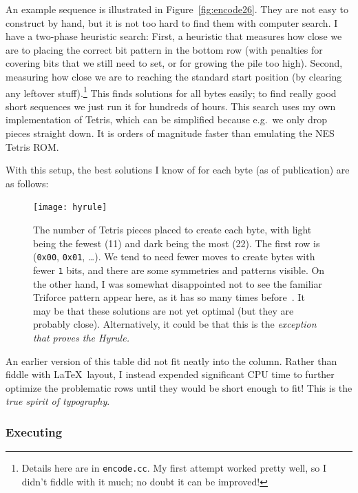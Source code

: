 \documentclass[twocolumn]{article}
\begin{document}
An example sequence is illustrated in Figure~\ref{fig:encode26}. They
are not easy to construct by hand, but it is not too hard to find them
with computer search. I have a two-phase heuristic search: First,
a heuristic that measures how close we are to placing the correct bit
pattern in the bottom row (with penalties for covering bits that we
still need to set, or for growing the pile too high). Second, measuring
how close we are to reaching the standard start position (by clearing
any leftover stuff).\!\footnote{Details here are in {\tt encode.cc}.
  My first attempt worked pretty well, so I didn't fiddle with it
  much; no doubt it can be improved!} This finds solutions for all
bytes easily; to find really good short sequences we just run it for
hundreds of hours. This search uses my own implementation of Tetris,
which can be simplified because e.g.~we only drop pieces straight down.
It is orders of magnitude faster than emulating the NES Tetris ROM.

With this setup, the best solutions I know of for each byte (as of
publication) are as follows:

\begin{figure}[ht]
  \centering
  \texttt{[image: hyrule]}
  \caption{
    The number of Tetris pieces placed to create each byte, with
    light being the fewest (11) and dark being the most (22). The
    first row is ({\tt 0x00}, {\tt 0x01}, \ldots). We tend to need
    fewer moves to create bytes with fewer {\tt 1} bits, and there
    are some symmetries and patterns visible. On the other hand,
    I was somewhat disappointed not to see the familiar Triforce
    pattern appear here, as it has so many times before~\cite{murphy2014new,murphy2017zm,murphy2018making}. It may be that these solutions are not yet
    optimal (but they are probably close). Alternatively, 
    it could be that this is the {\em exception that proves
    the Hyrule.}
  } \label{fig:hyrule}
\end{figure}



An earlier version of this table did not fit neatly into the column.
Rather than fiddle with \LaTeX\ layout, I instead expended significant
CPU time to further optimize the problematic rows until they would
be short enough to fit! This is the {\em true spirit of typography}.

\subsubsection{Executing}
\end{document}
